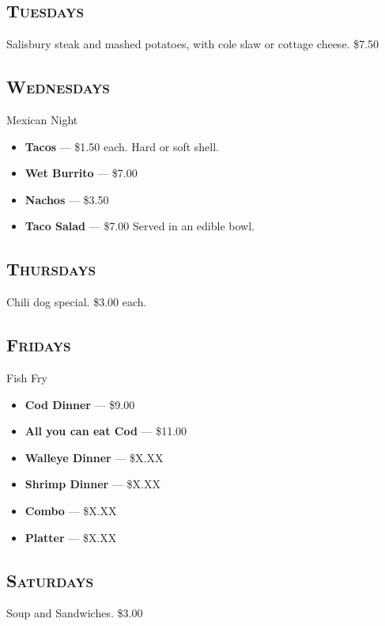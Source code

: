 \documentclass{tufte-handout}
\begin{document}
\begin{fullwidth}

\subsection{\textsc{Tuesdays}}
Salisbury steak and mashed potatoes, with cole slaw or cottage cheese. \$7.50

\subsection{\textsc{Wednesdays}}
Mexican Night
\begin{itemize}
\item \textbf{Tacos} --- \$1.50 each. Hard or soft shell.
\item \textbf{Wet Burrito} --- \$7.00
\item \textbf{Nachos} --- \$3.50
\item \textbf{Taco Salad} --- \$7.00 Served in an edible bowl.
\end{itemize}

\subsection{\textsc{Thursdays}}
Chili dog special. \$3.00 each.

\subsection{\textsc{Fridays}}
Fish Fry
\begin{itemize}
\item \textbf{Cod Dinner} --- \$9.00
\item \textbf{All you can eat Cod} --- \$11.00
\item \textbf{Walleye Dinner} --- \$X.XX
\item \textbf{Shrimp Dinner} --- \$X.XX
\item \textbf{Combo} --- \$X.XX
\item \textbf{Platter} --- \$X.XX
\end{itemize}

\subsection{\textsc{Saturdays}}

Soup and Sandwiches. \$3.00

\end{fullwidth}
\end{document}
